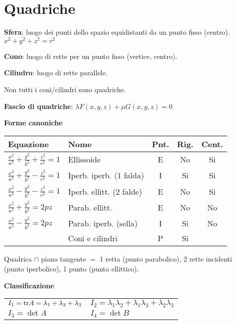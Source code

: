 \section{Quadriche}



\textbf{Sfera}: luogo dei punti dello spazio equidistanti da un punto fisso (centro). $x^2+y^2+z^2=r^2$

\textbf{Cono}: luogo di rette per un punto fisso (vertice, centro).

\textbf{Cilindro}: luogo di rette parallele.

Non tutti i coni/cilindri sono quadriche.

% 



\textbf{Fascio di quadriche}: $\lambda F(x, y, z) + \mu G(x, y, z) = 0$

\textbf{Forme canoniche}
\setlength{\tabcolsep}{0.2em}%
\begin{tabular}{llccc}
	\textbf{Equazione} & \textbf{Nome} & \textbf{Pnt.} & \textbf{Rig.} & \textbf{Cent.} \\
	\hline
	$\frac{x^2}{a^2} + \frac{y^2}{b^2} + \frac{z^2}{c^2} = 1$ & Ellissoide & E & No & Si \\
	$\frac{x^2}{a^2} + \frac{y^2}{b^2} - \frac{z^2}{c^2} = 1$ & Iperb. iperb. (1 falda) & I & Si & Si \\
	$\frac{x^2}{a^2} - \frac{y^2}{b^2} - \frac{z^2}{c^2} = 1$ & Iperb. ellitt. (2 falde) & E & No & Si \\
	$\frac{x^2}{a^2} + \frac{y^2}{b^2} = 2pz$ & Parab. ellitt. & E & No & No \\
	$\frac{x^2}{a^2} - \frac{y^2}{b^2} = 2pz$ & Parab. iperb. (sella) & I & Si & No \\
	 & Coni e cilindri & P & Si & \\
\end{tabular}

Quadrica $\cap$ piano tangente $=$ 1 retta (punto parabolico), 2 rette incidenti (punto iperbolico), 1 punto (punto ellittico).

\textbf{Classificazione}
\begin{tabular}{ll}
	$I_1=\mathrm{tr} A = \lambda_1+\lambda_2+\lambda_3$ & $I_2=\lambda_1\lambda_2+\lambda_1\lambda_3+\lambda_2\lambda_3$ \\
	$I_3 = \det A$ & $I_4 = \det B$
\end{tabular}

